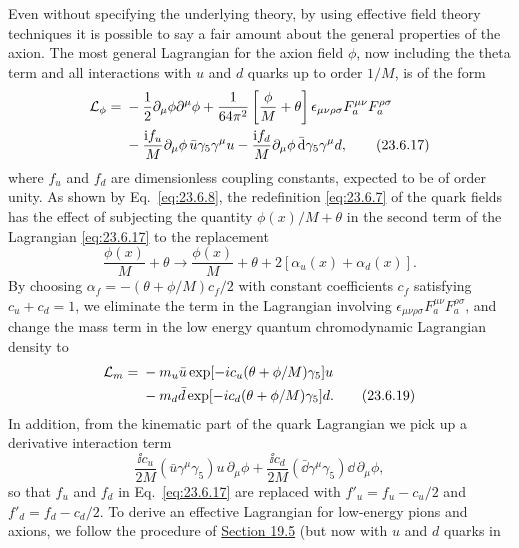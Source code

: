 Even without specifying the underlying theory, by using effective field
theory techniques it is possible to say a fair amount about the general
properties of the axion. The most general Lagrangian for the axion field
$\phi$, now including the theta term and all interactions with $u$ and
$d$ quarks up to order $1/M$, is of the form
\begin{align}
\mathcal L_\phi={}&-\frac12\partial_\mu\phi\partial^\mu\phi
+\frac{1}{64\pi^2}\left[\frac{\phi}{M}+\theta\right]
\epsilon_{\mu\nu\rho\sigma}F_a^{\mu\nu}F_a^{\rho\sigma}
\notag\\
&-\frac{\mathrm{i} f_u}{M}\partial_\mu\phi\,
\bar u\gamma_5\gamma^\mu u
-\frac{\mathrm{i} f_d}{M}\partial_\mu\phi\,
\bar {\mathop{}\!\mathrm{d}}\gamma_5\gamma^\mu d,
\tag{23.6.17}\label{eq:23.6.17}
\end{align}
where $f_u$ and $f_d$ are dimensionless coupling constants, expected to
be of order unity. As shown by Eq.~\eqref{eq:23.6.8}, the redefinition
\eqref{eq:23.6.7} of the quark fields has the effect of subjecting the
quantity $\phi(x)/M+\theta$ in the second term of the Lagrangian
\eqref{eq:23.6.17} to the replacement
\begin{equation}
\frac{\phi(x)}{M}+\theta\longrightarrow
\frac{\phi(x)}{M}+\theta+2[\alpha_u(x)+\alpha_d(x)].
\tag{23.6.18}\label{eq:23.6.18}
\end{equation}
By choosing $\alpha_f=-(\theta+\phi/M)c_f/2$ with constant coefficients
$c_f$ satisfying $c_u+c_d=1$, we eliminate the term in the Lagrangian
involving $\epsilon_{\mu\nu\rho\sigma}F_a^{\mu\nu}F_a^{\rho\sigma}$,
and change the mass term in the low energy quantum chromodynamic
Lagrangian density to
\begin{align}
\mathcal L_m={}&-m_u\bar u
\exp[-ic_u(\theta+\phi/M)\gamma_5]u
\notag\\
&-m_d\bar d
\exp[-ic_d(\theta+\phi/M)\gamma_5]d.
\tag{23.6.19}\label{eq:23.6.19}
\end{align}
In addition, from the kinematic part of the quark Lagrangian we pick up
a derivative interaction term
\begin{equation}
\frac{\ii c_u}{2M}(\bar u\gamma^\mu\gamma_5)u\,\partial_\mu\phi
+\frac{\ii c_d}{2M}(\bar \dd\gamma^\mu\gamma_5)\dd\,\partial_\mu\phi,
\tag{23.6.20}\label{eq:23.6.20}
\end{equation}
so that $f_u$ and $f_d$ in Eq.~\eqref{eq:23.6.17} are replaced with
$f'_u=f_u-c_u/2$ and $f'_d=f_d-c_d/2$. To derive an effective Lagrangian
for low-energy pions and axions, we follow the procedure of
\hyperref[sec:19.5]{Section 19.5} (but now with $u$ and $d$ quarks in
